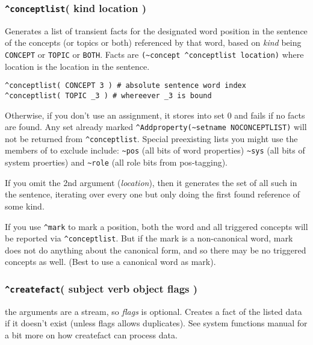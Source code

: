 \documentclass[]{article}
\begin{document}
\subsubsection{\texorpdfstring{\texttt{\^{}conceptlist}( kind location
)}{\^{}conceptlist( kind location )}}\label{conceptlist-kind-location}

Generates a list of transient facts for the designated word position in
the sentence of the concepts (or topics or both) referenced by that
word, based on \emph{kind} being \texttt{CONCEPT} or \texttt{TOPIC} or
\texttt{BOTH}. Facts are
\texttt{(\textasciitilde{}concept\ \^{}conceptlist\ location)} where
location is the location in the sentence.

\begin{verbatim}
^conceptlist( CONCEPT 3 ) # absolute sentence word index
^conceptlist( TOPIC _3 ) # whereever _3 is bound
\end{verbatim}

Otherwise, if you don't use an assignment, it stores into set 0 and
fails if no facts are found. Any set already marked
\texttt{\^{}Addproperty(\textasciitilde{}setname\ NOCONCEPTLIST)} will
not be returned from \texttt{\^{}conceptlist}. Special preexisting lists
you might use the members of to exclude include:
\texttt{\textasciitilde{}pos} (all bits of word properties)
\texttt{\textasciitilde{}sys} (all bits of system proerties) and
\texttt{\textasciitilde{}role} (all role bits from pos-tagging).

If you omit the 2nd argument (\emph{location}), then it generates the
set of all such in the sentence, iterating over every one but only doing
the first found reference of some kind.

If you use \texttt{\^{}mark} to mark a position, both the word and all
triggered concepts will be reported via \texttt{\^{}conceptlist}. But if
the mark is a non-canonical word, mark does not do anything about the
canonical form, and so there may be no triggered concepts as well. (Best
to use a canonical word as mark).

\subsubsection{\texorpdfstring{\texttt{\^{}createfact}( subject verb
object flags
)}{\^{}createfact( subject verb object flags )}}\label{createfact-subject-verb-object-flags}

the arguments are a stream, so \emph{flags} is optional. Creates a fact
of the listed data if it doesn't exist (unless flags allows duplicates).
See system functions manual for a bit more on how createfact can process
data.
\end{document}
